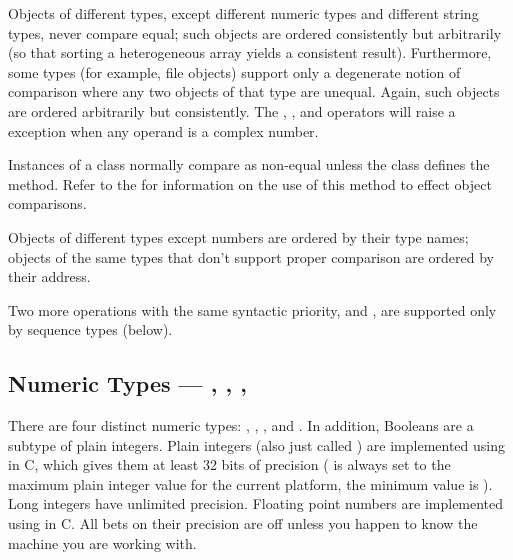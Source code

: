 Objects of different types, except different numeric types and different string types, never
compare equal; such objects are ordered consistently but arbitrarily
(so that sorting a heterogeneous array yields a consistent result).
Furthermore, some types (for example, file objects) support only a
degenerate notion of comparison where any two objects of that type are
unequal.  Again, such objects are ordered arbitrarily but
consistently. The \code{<}, \code{<=}, \code{>} and \code{>=}
operators will raise a  exception when any operand
is a complex number. 

Instances of a class normally compare as non-equal unless the class
defines the  method.  Refer to the
 for
information on the use of this method to effect object comparisons.

 Objects of different types except
numbers are ordered by their type names; objects of the same types
that don't support proper comparison are ordered by their address.

Two more operations with the same syntactic priority,
 and , are supported
only by sequence types (below).


\subsection{Numeric Types ---
	    , , , 
	    \label{typesnumeric}}

There are four distinct numeric types: ,
, 
, and .
In addition, Booleans are a subtype of plain integers.
Plain integers (also just called )
are implemented using  in C, which gives them at least 32
bits of precision ( is always set to the maximum
plain integer value for the current platform, the minimum value is 
).  Long integers have unlimited precision.
Floating point numbers are implemented using  in C.
All bets on their precision are off unless you happen to know the
machine you are working with.

